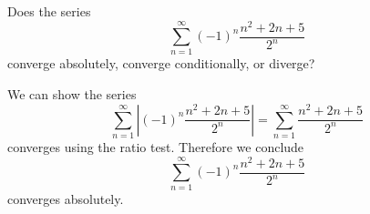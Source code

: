 \documentclass{ximera}
\begin{document}
  \begin{question}
    Does the series
    \[
    \sum_{n=1}^\infty (-1)^n\frac{n^2+2n+5}{2^n}
    \]
    converge absolutely, converge conditionally, or diverge?
    \begin{prompt}
      \begin{multipleChoice}
      \end{multipleChoice}
      \begin{feedback}
        We can show the series
        \[
        \sum_{n=1}^\infty \left|(-1)^n\frac{n^2+2n+5}{2^n}\right|=\sum_{n=1}^\infty \frac{n^2+2n+5}{2^n}
        \]
        converges using the ratio test.  Therefore we conclude
        \[
        \sum_{n=1}^\infty (-1)^n\frac{n^2+2n+5}{2^n}
        \]
        converges absolutely.
      \end{feedback}
    \end{prompt}
  \end{question}
\end{document}
